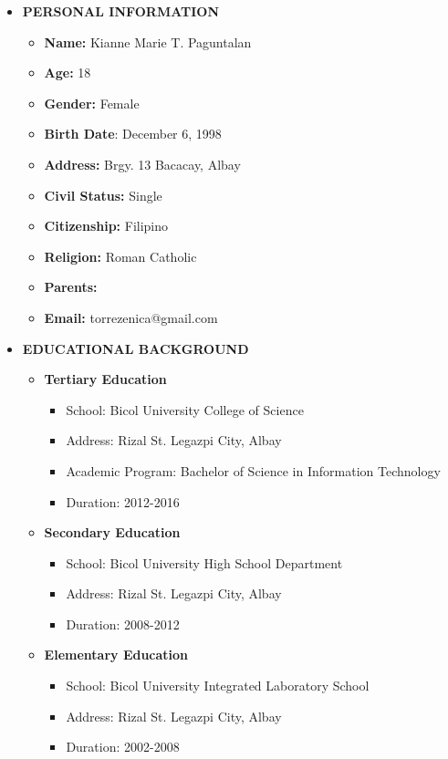 \begin{itemize}
	\vspace{-25mm}
	\item []\textbf{ PERSONAL INFORMATION}
	\begin{itemize}
		\item  \textbf{Name:} {Kianne Marie T. Paguntalan}
		\item  \textbf{Age:} {18}
		\item  \textbf{Gender:} {Female}
		\item  \textbf{Birth Date}: {December 6, 1998}
		\item  \textbf{Address:} {Brgy. 13 Bacacay, Albay}
		\item  \textbf{Civil Status:} {Single}
		\item  \textbf{Citizenship:} {Filipino}
		\item  \textbf{Religion:} {Roman Catholic}
		\item  \textbf{Parents:} {}
		\item  \textbf{Email:} {torrezenica@gmail.com}
	\end{itemize}
	\item []\textbf{EDUCATIONAL BACKGROUND}
	\begin{itemize}
		\item \textbf{Tertiary Education}
		\begin{itemize}
			\item School: Bicol University College of Science
			\item Address: Rizal St. Legazpi City, Albay
			\item Academic Program: Bachelor of Science in Information Technology
			\item Duration: 2012-2016
		\end{itemize}
		\item \textbf{Secondary Education}
		\begin{itemize}
			\item School: Bicol University High School Department
			\item Address: Rizal St. Legazpi City, Albay
			\item Duration: 2008-2012
		\end{itemize}
		\item \textbf{Elementary Education}
		\begin{itemize}
			\item School: Bicol University Integrated Laboratory School
			\item Address: Rizal St. Legazpi City, Albay
			\item Duration: 2002-2008
		\end{itemize}
	\end{itemize}
\end{itemize}	
	
	
	





